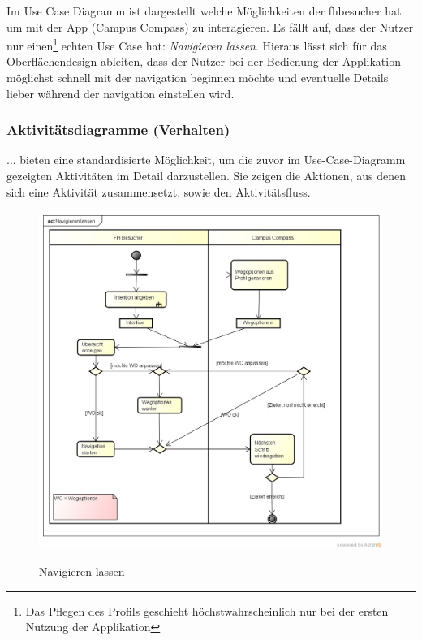 Im Use Case Diagramm ist dargestellt welche Möglichkeiten der \gls{fhbesucher} hat um mit der App (Campus Compass) zu interagieren. Es fällt auf, dass der Nutzer nur einen\footnote{Das Pflegen des Profils geschieht höchstwahrscheinlich nur bei der ersten Nutzung der Applikation} echten Use Case hat: \emph{Navigieren lassen}. Hieraus lässt sich für das Oberflächendesign ableiten, dass der Nutzer bei der Bedienung der Applikation möglichst schnell mit der \gls{navigation} beginnen möchte und eventuelle Details lieber während der \gls{navigation} einstellen wird.

\newpage

\subsubsection*{Aktivitätsdiagramme (Verhalten)}
... bieten eine standardisierte Möglichkeit, um die zuvor im Use-Case-Diagramm gezeigten Aktivitäten im Detail darzustellen. Sie zeigen die Aktionen, aus denen sich eine Aktivität zusammensetzt, sowie den Aktivitätsfluss.

\begin{figure}[hbt]
  \centering
  \includegraphics[width=\linewidth]{img/akt_navigieren_lassen.png}
  \label{img:akt_navigieren_lassen}
  \caption{Navigieren lassen}
\end{figure}

